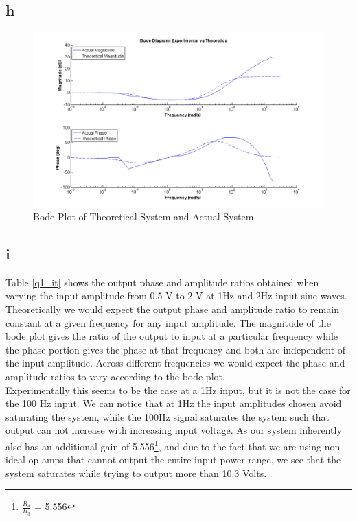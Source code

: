 \documentclass{article}
\theoremstyle{plain}
\theoremstyle{definition}
\theoremstyle{remark}
\begin{document}
\subsection*{h}
\begin{figure}[hbt]
\begin{center}
\includegraphics[width = 17cm]{bodeplot.png}
\caption{Bode Plot of Theoretical System and Actual System}
\label{q1_fh}
\end{center}
\end{figure}

\subsection*{i}

Table \ref{q1_it} shows the output phase and amplitude ratios obtained when varying the input amplitude from 0.5 V to 2 V at 1Hz and 2Hz input sine waves.  Theoretically we would expect the output phase and amplitude ratio to remain constant at a given frequency for any input amplitude.  The magnitude of the bode plot gives the ratio of the output to input at a particular frequency while the phase portion gives the phase at that frequency and both are independent of the input amplitude.  Across different frequencies we would expect the phase and amplitude ratios to vary according to the bode plot.  \\

Experimentally this seems to be the case at a 1Hz input, but it is not the case for the 100 Hz input.  We can notice that at 1Hz the input amplitudes chosen avoid saturating the system, while the 100Hz signal saturates the system such that output can not increase with increasing input voltage. As our system inherently also has an additional gain of 5.556\footnote{$\frac{R_4}{R_3}$ = 5.556}, and due to the fact that we are using non-ideal op-amps that cannot output the entire input-power range, we see that the system saturates while trying to output more than 10.3 Volts.
\end{document}
